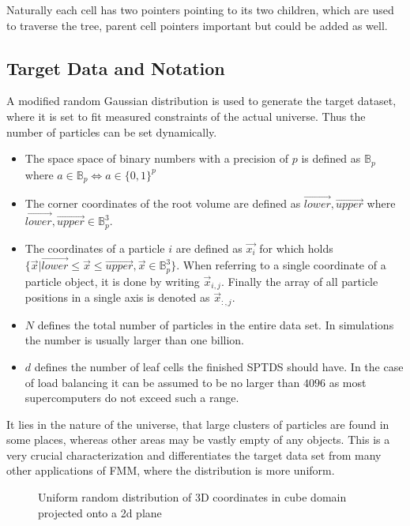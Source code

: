 \documentclass[]{article}
\begin{document}
Naturally each cell has two pointers pointing to its two children, which are used to traverse the tree, parent cell pointers important but could be added as well.


\subsection{Target Data and Notation}\label{sec:target-data}

A modified random Gaussian distribution is used to generate the target dataset, where it is set to fit measured constraints of the actual universe. Thus the number of particles can be set dynamically. 

\begin{itemize}
	\item The space space of binary numbers with a precision of $p$ is defined as $\mathbb{B}_p$ where $a \in \mathbb{B}_p \Leftrightarrow a \in \{0,1\}^{p}$
	\item The corner coordinates of the root volume are defined as $\vec{lower}, \vec{upper}$ where $\vec{lower}, \vec{upper} \in \mathbb{B}_p^3$. 
	\item The coordinates of a particle $i$ are defined as $\vec{x_i}$ for which holds $\{\vec{x} | \vec{lower} \leq \vec{x} \leq \vec{upper}, \vec{x} \in \mathbb{B}_p^3 \}$.
	When referring to a single coordinate of a particle object, it is done by writing $\vec{x}_{i,j}$. Finally the array of all particle positions in a single axis is denoted as $\vec{x}_{:,j}$. 
	\item $N$ defines the total number of particles in the entire data set. In simulations the number is usually larger than one billion. 
	\item $d$ defines the number of leaf cells the finished SPTDS should have. In the case of load balancing it can be assumed to be no larger than $4096$ as most supercomputers do not exceed such a range.
\end{itemize}

It lies in the nature of the universe, that large clusters of particles are found in some places, whereas other areas may be vastly empty of any objects. This is a very crucial characterization and differentiates the target data set from many other applications of FMM, where the distribution is more uniform.

\begin{figure}[H]
	\begin{center}
	\end{center}
	\caption{Uniform random distribution of 3D coordinates in cube domain projected onto a 2d plane}
\end{figure}
\end{document}
